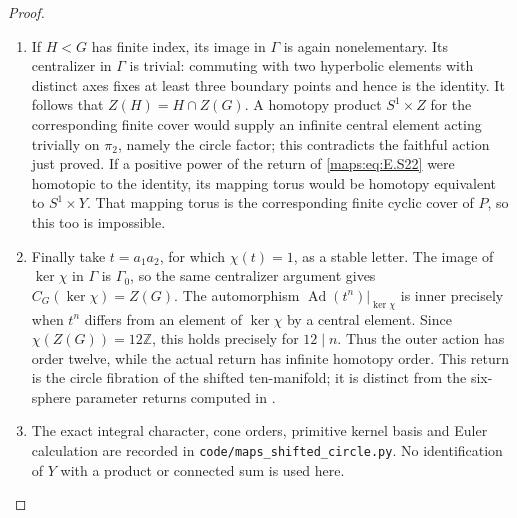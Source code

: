 \begin{proof}
\begin{enumerate}[label=\arabic*.,leftmargin=*]
\item If $H<G$ has finite index, its image in $\Gamma$ is again
nonelementary. Its centralizer in $\Gamma$ is trivial:
commuting with two hyperbolic elements with distinct axes
fixes at least three boundary points and hence is the
identity. It follows that
$Z(H)=H\cap Z(G)$. A homotopy product $S^1\times Z$ for
the corresponding finite cover would supply an infinite
central element acting trivially on $\pi_2$, namely the
circle factor; this contradicts the faithful action just
proved. If a positive power of the return of \eqref{maps:eq:E.S22} were
homotopic to the identity, its mapping torus would be
homotopy equivalent to $S^1\times Y$. That mapping torus
is the corresponding finite cyclic cover of $P$, so this
too is impossible.

\item Finally take $t=a_1a_2$, for which $\chi(t)=1$, as a
stable letter. The image of $\ker\chi$ in $\Gamma$ is
$\Gamma_0$, so the same centralizer argument gives
$C_G(\ker\chi)=Z(G)$. The automorphism
$\operatorname{Ad}(t^n)|_{\ker\chi}$ is inner precisely
when $t^n$ differs from an element of $\ker\chi$ by a
central element. Since $\chi(Z(G))=12\mathbb Z$, this
holds precisely for $12\mid n$. Thus the outer action has
order twelve, while the actual return has infinite homotopy
order. This return is the circle fibration of the shifted
ten-manifold; it is distinct from the six-sphere parameter
returns computed in .

\item The exact integral character, cone orders, primitive kernel
basis and Euler calculation are recorded in
\texttt{code/maps\_shifted\_circle.py}. No identification
of $Y$ with a product or connected sum is used here.
\end{enumerate}
\end{proof}

